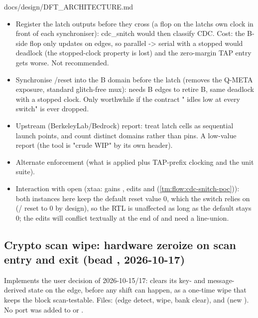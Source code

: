 \begin{relocated}{docs/design/DFT_ARCHITECTURE.md}
\begin{itemize}
\tightlist
\item
  Register the latch outputs before they cross (a flop on the
  latch\textquotesingle s own clock in front of each synchroniser):
  cdc\_\allowbreak{}snitch would then classify CDC. Cost: the B-side
  flop only updates on  edges, so parallel
  -\textgreater{} serial with a stopped  would deadlock
  (the stopped-clock property is lost) and the zero-margin TAP entry
  gets worse. Not recommended.
\item
  Synchronise /reset into the B domain before the latch
  (removes the Q-META exposure, standard glitch-free mux): needs B edges
  to retire B, same deadlock with a stopped clock. Only worthwhile if
  the contract " idles low at every switch" is ever
  dropped.
\item
  Upstream (BerkeleyLab/\allowbreak{}Bedrock) report: treat latch cells
  as sequential launch points, and count distinct domains rather than
  pins. A low-value report (the tool is "crude WIP" by its own header).
\item
  Alternate enforcement (what is applied plus
   TAP-prefix clocking and the unit suite).
\item
  Interaction with open  (xtaa:  gains
  , edits  and
   (\cref{tm:flow:cdc-snitch-poc})): both instances here keep the default reset
  value 0, which the switch relies on
  (/ reset to 0 by design), so the RTL
  is unaffected as long as the default stays 0; the
   edits will conflict textually at the end of
   and need a line-union.
\end{itemize}

\subsection{\texorpdfstring{Crypto scan wipe: hardware zeroize on
scan entry and exit (bead ,
2026-10-17)}{Crypto scan wipe: hardware zeroize on scan entry and exit (bead , 2026-10-17)}}\label{tm:ch:dft-architecture:1410-crypto-scan-wipe-hardware-zeroize-on-scan-entry-and-exit-bead-j41m6-2026-10-17}

Implements the user decision of 2026-10-15/\allowbreak{}17:
 clears its key- and message-derived state on the
 edge, before any shift can happen, as a one-time wipe
that keeps the block scan-testable. Files:
 (edge detect, wipe, bank clear),
 and  (new ). No
port was added to  or .


\end{relocated}
